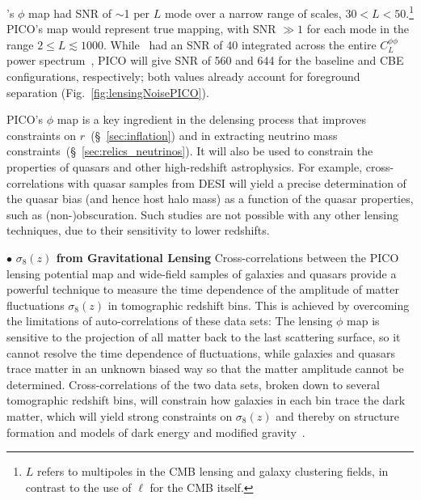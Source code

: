 \documentclass[PICOReport.tex]{subfiles}
\begin{document}
\planck 's $\phi$ map had \ac{SNR} of $\sim$1 per $L$ mode over a narrow range of scales, $30 < L < 50$.\footnote{$L$ refers to multipoles in the CMB lensing and galaxy clustering fields, in contrast to the use of $\ell$  for the CMB itself. } PICO's map would represent true mapping, with \ac{SNR} $\gg1$ for each mode in the range $2 \leq L \lesssim 1000$.  While \planck\ had an \ac{SNR} of 40 integrated across the entire $C_{L}^{\phi \phi}$ power spectrum~\citep{2018arXiv180706210P}, PICO will give \ac{SNR} of 560 and 644 for the baseline and CBE configurations, respectively; both values already account for foreground separation (Fig.~\ref{fig:lensingNoisePICO}). 

PICO's $\phi$ map is a key ingredient in the delensing process that improves constraints on $r$~(\S~\ref{sec:inflation}) and in extracting neutrino mass constraints~(\S~\ref{sec:relics_neutrinos}). It will also be used to constrain the properties of quasars and other high-redshift astrophysics.  For example, cross-correlations with quasar samples from DESI will yield a precise determination of the quasar bias (and hence host halo mass) as a function of the quasar properties, such as (non-)obscuration.  Such studies are not possible with any other lensing techniques, due to their sensitivity to lower redshifts.


\noindent$\bullet$ {\bf $\sigma_{8}(z)$ from Gravitational Lensing} \hspace{0.1in} \label{sigma8_lensing}
Cross-correlations between the PICO lensing potential map and wide-field samples of galaxies and quasars provide a powerful technique to measure the time dependence of the amplitude of matter fluctuations $\sigma_{8}(z)$ in tomographic redshift bins. This is achieved by overcoming the limitations of auto-correlations of these data sets:
The lensing $\phi$ map is sensitive to the projection of all matter back to the last scattering surface, so it cannot resolve the time dependence of fluctuations, while galaxies and quasars trace matter in an unknown biased way so that the matter amplitude cannot be determined.
Cross-correlations of the two data sets, broken down to several tomographic redshift bins, will constrain how galaxies in each bin trace the dark matter, which will yield strong constraints on $\sigma_8(z)$ and thereby on structure formation and models of dark energy and modified gravity~\citep{2009PhRvL.102b1302S,2018PhRvD..97l3540S}.
\end{document}
